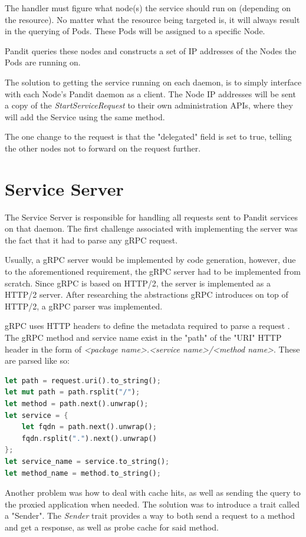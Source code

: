 \documentclass[a4paper,12pt]{report}
\begin{document}
The handler must figure what node(s) the service should run on (depending on the resource).
No matter what the resource being targeted is, it will always result in the querying of Pods.
These Pods will be assigned to a specific Node.

Pandit queries these nodes and constructs a set of IP addresses of the Nodes the Pods are running on.

The solution to getting the service running on each daemon, is to simply interface with each Node's Pandit daemon as a client.
The Node IP addresses will be sent a copy of the \textit{StartServiceRequest} to their own administration APIs, where they will add the Service using the same method.

The one change to the request is that the "delegated" field is set to true, telling the other nodes not to forward on the request further.

\section{Service Server}

The Service Server is responsible for handling all requests sent to Pandit services on that daemon.
The first challenge associated with implementing the server was the fact that it had to parse any gRPC request.

Usually, a gRPC server would be implemented by code generation, however, due to the aforementioned requirement, the gRPC server had to be implemented from scratch.
Since gRPC is based on HTTP/2, the server is implemented as a HTTP/2 server. After researching the abstractions gRPC introduces on top of HTTP/2,
a gRPC parser was implemented.

gRPC uses HTTP headers to define the metadata required to parse a request \cite{grpc_protocol}.
The gRPC method and service name exist in the "path" of the "URI" \cite{uris} HTTP header in the form of \textit{<package name>.<service name>/<method name>}.
These are parsed like so:

\begin{lstlisting}[language=Rust]
let path = request.uri().to_string();
let mut path = path.rsplit("/");
let method = path.next().unwrap();
let service = {
    let fqdn = path.next().unwrap();
    fqdn.rsplit(".").next().unwrap()
};
let service_name = service.to_string();
let method_name = method.to_string();
\end{lstlisting}

Another problem was how to deal with cache hits, as well as sending the query to the proxied application when needed.
The solution was to introduce a trait called a "Sender".
The \textit{Sender} trait provides a way to both send a request to a method and get a response, as well as probe cache for said method.
\end{document}
